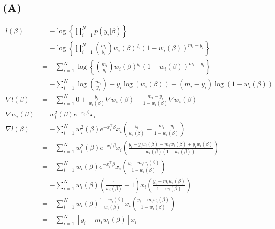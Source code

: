 \documentclass{article}
\begin{document}
\subsection{(A)}
\begin{align*}
l(\beta)&=-\log\left\{\prod_{i=1}^N p(y_i | \beta)\right\}\\
&=-\log\left\{\prod_{i=1}^N \binom{m_i}{y_i} w_i(\beta)^{y_i} (1-w_i(\beta))^{m_i-y_i}\right\}\\
&=-\sum_{i=1}^N\log\left\{\binom{m_i}{y_i} w_i(\beta)^{y_i} (1-w_i(\beta))^{m_i-y_i}\right\}\\
&=-\sum_{i=1}^N\log\binom{m_i}{y_i} + y_i\log(w_i(\beta)) + (m_i-y_i)\log(1-w_i(\beta))\\
\nabla l(\beta)&=-\sum_{i=1}^N 0 + \frac{y_i}{w_i(\beta)} \nabla w_i(\beta) - \frac{m_i-y_i}{1-w_i(\beta)} \nabla w_i(\beta)\\
\nabla w_i(\beta)&=w_i^2(\beta) e^{-x_i^\top\beta} x_i\\
\nabla l(\beta)&=-\sum_{i=1}^N w_i^2(\beta) e^{-x_i^\top\beta} x_i\left(\frac{y_i}{w_i(\beta)}  - \frac{m_i-y_i}{1-w_i(\beta)}\right)\\
&=-\sum_{i=1}^N w_i^2(\beta) e^{-x_i^\top\beta} x_i\left(\frac{y_i-y_iw_i(\beta) - m_iw_i(\beta) + y_iw_i(\beta)}{w_i(\beta)(1-w_i(\beta))}\right)\\
&=-\sum_{i=1}^N w_i(\beta) e^{-x_i^\top\beta} x_i\left(\frac{y_i- m_iw_i(\beta)}{1-w_i(\beta)}\right)\\
&=-\sum_{i=1}^N w_i(\beta) \left(\frac{1}{w_i(\beta)} - 1\right)x_i\left(\frac{y_i- m_iw_i(\beta)}{1-w_i(\beta)}\right)\\
&=-\sum_{i=1}^N w_i(\beta) \frac{1-w_i(\beta)}{w_i(\beta)}x_i\left(\frac{y_i- m_iw_i(\beta)}{1-w_i(\beta)}\right)\\
&=-\sum_{i=1}^N \left[y_i- m_iw_i(\beta)\right]x_i\\
\end{align*}
\end{document}
